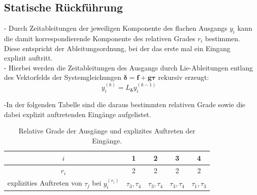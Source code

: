 \subsection{Statische Rückführung}
- Durch Zeitableitungen der jeweiligen Komponente des flachen Ausgangs $y_i$ kann die damit korrespondierende Komponente des relativen Grades $r_i$ bestimmen. Diese entspricht der Ableitungsordnung, bei der das erste mal ein Eingang explizit auftritt.\\
- Hierbei werden die Zeitableitungen des Ausgangs durch Lie-Ableitungen entlang des Vektorfelds der Systemgleichungen $\mathbf{\delta} = \mathbf{f} + \mathbf{g} \mathbf{\tau}$ rekursiv erzeugt: 
\begin{equation}
	y_i^{(k)} = L_{\mathbf{\delta}} y_i^{(k-1)}
\end{equation}

-In der folgenden Tabelle sind die daraus bestimmten relativen Grade sowie die dabei explizit auftretenden Eingänge aufgelistet.

\begin{table}[htbp]%
	\centering
	\caption{Relative Grade der Ausgänge und explizites Auftreten der Eingänge.}
	\label{tab:relative_degrees}
	\begin{tabular}{c| c c c c} 
		$i$ & 1 & 2 & 3 & 4 \\ 
		\hline
		$r_i$ & 2 & 2 & 2 & 2\\ 
		\hline
		explizities Auftreten von $\tau_j$ bei $y_i^{(r_i)}$ & $\tau_3, \tau_4$ & $\tau_3, \tau_4$ & $\tau_3, \tau_4$ & $\tau_1, \tau_3$ \\ 
		\bottomrule
	\end{tabular}
\end{table}

